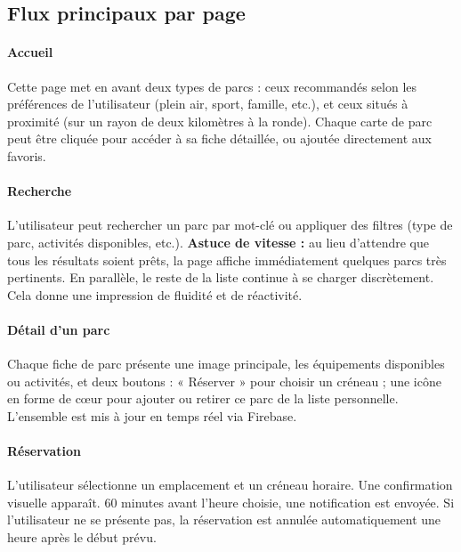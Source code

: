 \documentclass[12pt,a4paper]{article}
\begin{document}
\subsection{Flux principaux par page}

\paragraph{Accueil \\}
Cette page met en avant deux types de parcs : ceux recommandés selon les préférences de l'utilisateur (plein air, sport, famille, etc.), et ceux situés à proximité (sur un rayon de deux kilomètres à la ronde). Chaque carte de parc peut être cliquée pour accéder à sa fiche détaillée, ou ajoutée directement aux favoris.

\paragraph{Recherche \\}
L'utilisateur peut rechercher un parc par mot-clé ou appliquer des filtres (type de parc, activités disponibles, etc.).  
\textbf{Astuce de vitesse :} au lieu d'attendre que tous les résultats soient prêts, la page affiche immédiatement quelques parcs très pertinents. En parallèle, le reste de la liste continue à se charger discrètement. Cela donne une impression de fluidité et de réactivité.

\paragraph{Détail d'un parc \\}
Chaque fiche de parc présente une image principale, les équipements disponibles ou activités, et deux boutons :  
 « Réserver » pour choisir un créneau ;  
 une icône en forme de cœur pour ajouter ou retirer ce parc de la liste personnelle.  
L'ensemble est mis à jour en temps réel via Firebase.

\paragraph{Réservation \\}
L'utilisateur sélectionne un emplacement et un créneau horaire. Une confirmation visuelle apparaît.  
60 minutes avant l'heure choisie, une notification est envoyée. Si l'utilisateur ne se présente pas, la réservation est annulée automatiquement une heure après le début prévu.
\end{document}
